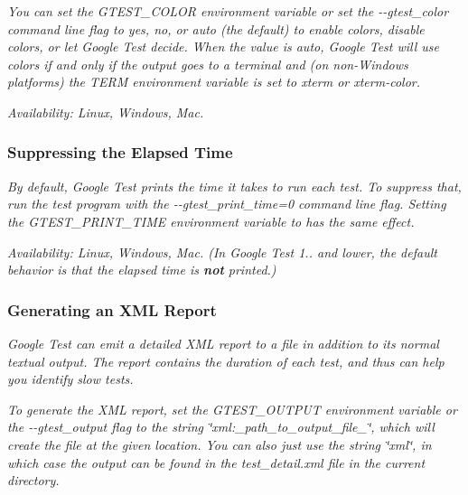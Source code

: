 {\itshape You can set the G\+T\+E\+S\+T\+\_\+\+C\+O\+L\+OR environment variable or set the {\ttfamily -\/-\/gtest\+\_\+color} command line flag to {\ttfamily yes}, {\ttfamily no}, or {\ttfamily auto} (the default) to enable colors, disable colors, or let Google Test decide. When the value is {\ttfamily auto}, Google Test will use colors if and only if the output goes to a terminal and (on non-\/\+Windows platforms) the {\ttfamily T\+E\+RM} environment variable is set to {\ttfamily xterm} or {\ttfamily xterm-\/color}.}

{\itshape {\itshape Availability\+:} Linux, Windows, Mac.}

{\itshape \subsubsection*{Suppressing the Elapsed Time}}

{\itshape }

{\itshape By default, Google Test prints the time it takes to run each test. To suppress that, run the test program with the {\ttfamily -\/-\/gtest\+\_\+print\+\_\+time=0} command line flag. Setting the {\ttfamily G\+T\+E\+S\+T\+\_\+\+P\+R\+I\+N\+T\+\_\+\+T\+I\+ME} environment variable to {} has the same effect.}

{\itshape {\itshape Availability\+:} Linux, Windows, Mac. (In Google Test 1.. and lower, the default behavior is that the elapsed time is {\bfseries not} printed.)}

{\itshape \subsubsection*{Generating an X\+ML Report}}

{\itshape }

{\itshape Google Test can emit a detailed X\+ML report to a file in addition to its normal textual output. The report contains the duration of each test, and thus can help you identify slow tests.}

{\itshape To generate the X\+ML report, set the {\ttfamily G\+T\+E\+S\+T\+\_\+\+O\+U\+T\+P\+UT} environment variable or the {\ttfamily -\/-\/gtest\+\_\+output} flag to the string {\ttfamily \char`\"{}xml\+:\+\_\+path\+\_\+to\+\_\+output\+\_\+file\+\_\+\char`\"{}}, which will create the file at the given location. You can also just use the string {\ttfamily \char`\"{}xml\char`\"{}}, in which case the output can be found in the {\ttfamily test\+\_\+detail.\+xml} file in the current directory.}

